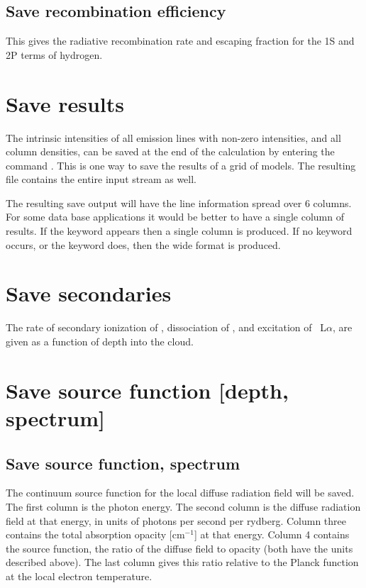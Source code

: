\subsection{Save recombination efficiency}

This gives the radiative recombination rate and escaping fraction
for the 1S and 2P terms of hydrogen.

\section{Save results}

The intrinsic intensities of all emission lines with non-zero
intensities, and all column densities,
can be saved at the end of the calculation by entering the command .
This is one way to save the results of a grid of
models.
The resulting file contains the entire input stream as well.

The resulting save output will have the line information spread over
6 columns.
For some data base applications it would be better to have a
single column of results.
If the keyword  appears then a single column
is produced.
If no keyword occurs, or the keyword  does, then the
wide format is produced.

\section{Save secondaries}

The rate of secondary ionization of \hO, dissociation of \htwo,
and excitation
of \hi\ L$\alpha $, are given as a function of depth into the cloud.

\section{Save source function [depth, spectrum]}

\subsection{Save source function, spectrum}

The continuum source function for the local diffuse radiation field will
be saved.  The first column is the photon energy.  The second column is
the diffuse radiation field at that energy, in units of photons per second
per rydberg.
Column three contains the total absorption opacity [cm$^{-1}$]
at that energy.
Column 4 contains the source function, the ratio of the
diffuse field to opacity (both have the units described above).
The last
column gives this ratio relative to the Planck function at the local
electron temperature.

